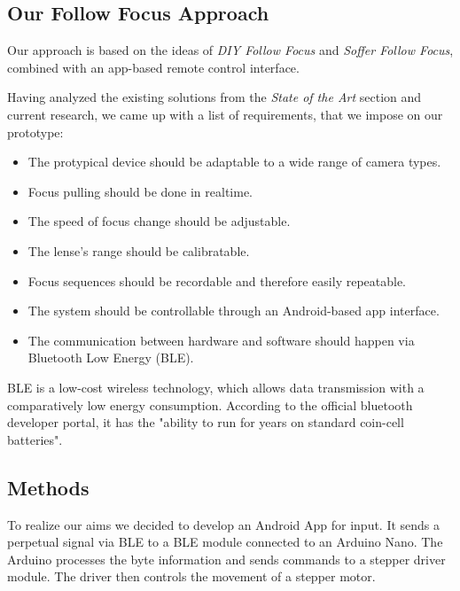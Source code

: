 \documentclass{sigchi}
\begin{document}
\subsection{Our Follow Focus Approach}
Our approach is based on the ideas of \textit{DIY Follow Focus} \cite{diyff} and \textit{Soffer Follow Focus}, combined with an app-based remote control interface.

Having analyzed the existing solutions from the \textit{State of the Art} section and current research, we came up with a list of requirements, that we impose on our prototype:
\begin{itemize}
  \item The protypical device should be adaptable to a wide range of camera types. 
  \item Focus pulling should be done in realtime.
  \item The speed of focus change should be adjustable.
  \item The lense's range should be calibratable.
  \item Focus sequences should be recordable and therefore easily repeatable.
  \item The system should be controllable through an Android-based app interface.
  \item The communication between hardware and software should happen via Bluetooth Low Energy (BLE).
\end{itemize}

BLE is a low-cost wireless technology, which allows data transmission with a comparatively low energy consumption. According to the official bluetooth developer portal, it has the "ability to run for years on standard coin-cell batteries". \cite{ble}

\subsection{Methods}
To realize our aims we decided to develop an Android App for input. It sends a perpetual signal via BLE to a BLE module connected to an Arduino Nano. The Arduino processes the byte information and sends commands to a stepper driver module. The driver then controls the movement of a stepper motor. 
\end{document}
